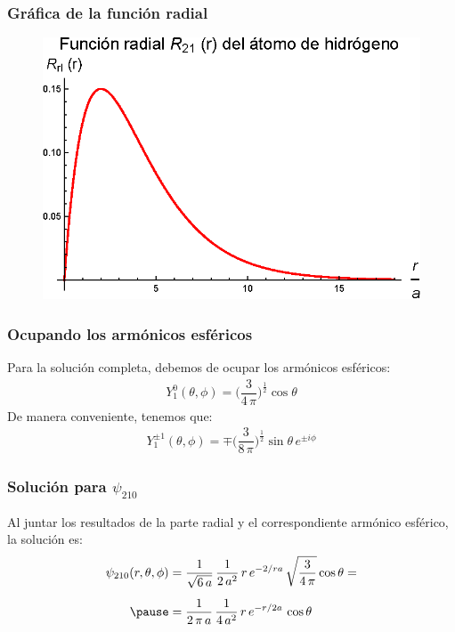 \documentclass[12pt]{beamer}
\begin{document}
\begin{frame}
\frametitle{Gráfica de la función radial}
\begin{figure}
   \centering
   \includegraphics[scale=1]{Imagenes/Plot_Hermite_Radial_21.eps}
\end{figure}
\end{frame}
\begin{frame}
\frametitle{Ocupando los armónicos esféricos}
Para la solución completa, debemos de ocupar los armónicos esféricos:
\pause
\begin{align*}
Y_{1}^{0} (\theta, \phi) = \bigg( \dfrac{3}{4 \, \pi} \bigg)^{\frac{1}{2}} \cos \theta
\end{align*}
\pause
De manera conveniente, tenemos que:
\pause
\begin{align*}
Y_{1}^{\pm 1} (\theta, \phi) = \mp \bigg( \dfrac{3}{8 \, \pi} \bigg)^{\frac{1}{2}} \sin \theta \, e^{\pm i \phi}
\end{align*}
\end{frame}
\begin{frame}
\frametitle{Solución para $\psi_{210}$}
Al juntar los resultados de la parte radial y el correspondiente armónico esférico, la solución es:
\pause
\begin{eqnarray*}
\begin{aligned}
\psi_{210} (r, \theta, \phi) &= \dfrac{1}{\sqrt{6 \, a}} \, \dfrac{1}{2 \, a^{2}} \, r \, e^{-2/ra} \, \sqrt{\dfrac{3}{4 \, \pi}} \cos \theta = \\[0.5em] \pause
&= \dfrac{1}{2 \, \pi \, a} \, \dfrac{1}{4 \, a^{2}} \, r \, e^{-r/2a} \, \cos \theta
\end{aligned}
\end{eqnarray*}
\end{frame}
\end{document}
